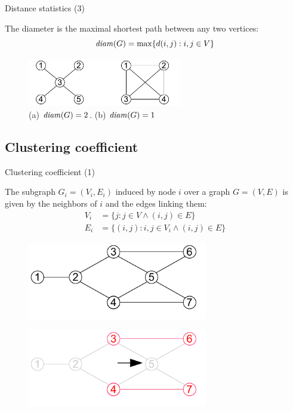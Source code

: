 \begin{frame}{Distance statistics (3)}

\begin{definition}[Diameter]
The \alert{diameter} is the maximal shortest path between any two vertices:
\[
  \mathit{diam}(G) = \max \{ d(i,j) : i,j \in V \}
\]
\end{definition}

\begin{figure}
\includegraphics[width=0.6\textwidth]{diameter}
\caption{(a) $\mathit{diam}(G) = 2$. (b) $\mathit{diam}(G) = 1$}
\end{figure}

\end{frame}

\subsection{Clustering coefficient}

\begin{frame}{Clustering coefficient (1)}

\begin{definition}
The subgraph $G_i=(V_i, E_i)$ \alert{induced} by node $i$ over a graph $G=(V,E)$ 
  is given by the neighbors of $i$ and the edges linking them:
  \begin{align*}
	 V_i &= \{ j : j \in V \wedge (i,j) \in E \} \\
	 E_i &= \{ (i,j) : i,j \in V_i \wedge (i,j) \in E \} 
  \end{align*}
\end{definition}

\bigskip
\begin{overprint}
\begin{figure}
\includegraphics[width=0.7\textwidth]{induced1}
\end{figure}
\begin{figure}
\includegraphics[width=0.7\textwidth]{induced2}
\end{figure}
\end{overprint}
\end{frame}

